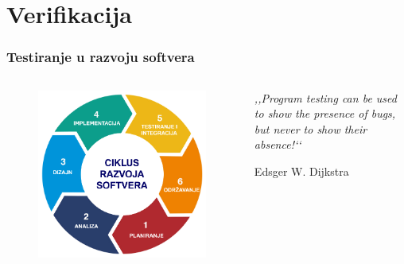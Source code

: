 \documentclass{beamer}
\begin{document}
\section{Verifikacija}
\begin{frame}
\frametitle{Testiranje u razvoju softvera}
\begin{columns}[c]
\begin{figure}
\includegraphics[width=1\linewidth]{rs.png}
\end{figure}

\epigraph{\emph{,,Program testing can be used to show the presence of bugs, but never to show their absence!‘‘}}{Edsger W. Dijkstra}

\end{columns}
\end{frame}
\end{document}
